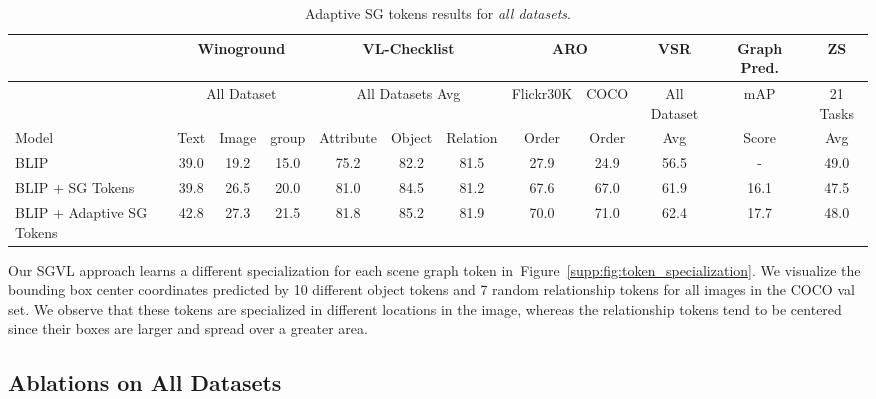 \documentclass[11pt]{article}
\newcommand{\minisection}[1]{\noindent{\textbf{#1}.}}
\newcommand{\figgref}[1]{Figure~\ref{#1}}
\begin{document}
\begin{table*}[t!]
\begin{small}
\begin{tabular}{l|ccc|ccc|cc|c|c|c}
            \toprule
            &\multicolumn{3}{c|}{Winoground} & \multicolumn{3}{c|}{VL-Checklist} & \multicolumn{2}{c|}{ARO} & 
            \multicolumn{1}{c|}{VSR} & 
            \multicolumn{1}{c|}{Graph Pred.} & 
            \multicolumn{1}{c}{ZS}
            \\
            \toprule
            &\multicolumn{3}{c|}{All Dataset}
            &\multicolumn{3}{c|}{All Datasets Avg}
            & Flickr30K
            & COCO
            & All Dataset
            & mAP
            & 21 Tasks\\
            Model & Text & Image & group & Attribute & Object & Relation & Order & Order & Avg & Score & Avg\\
            \midrule 
            BLIP  &39.0 &19.2 & 15.0 & 75.2 & 82.2 & 81.5 & 27.9 & 24.9 & 56.5 & - & 49.0\\
            BLIP + SG Tokens  & 39.8 &26.5 & 20.0  & 81.0 & 84.5 & 81.2 & 67.6 & 67.0 & 61.9 & 16.1 & 47.5\\
            BLIP + Adaptive SG Tokens &42.8 &27.3 & 21.5  & 81.8  & 85.2  & 81.9  & 70.0 & 71.0 & 62.4  & 17.7 &  48.0 \\

            \bottomrule        
    \end{tabular}
    \end{small}
\caption{Adaptive SG tokens results for \textit{all datasets}.}
\label{supp:tab:sg_tokens_all_datasets}
\end{table*} 
\minisection{Token specialization} Our SGVL approach learns a different specialization for each scene graph token in~\figgref{supp:fig:token_specialization}. We visualize the bounding box center coordinates predicted by 10 different object tokens and 7 random relationship tokens for all images in the COCO val set. We observe that these tokens are specialized in different locations in the image, whereas the relationship tokens tend to be centered since their boxes are larger and spread over a greater area.






\subsection{Ablations on All Datasets}
\label{supp:expr:all_datasets}
\end{document}

